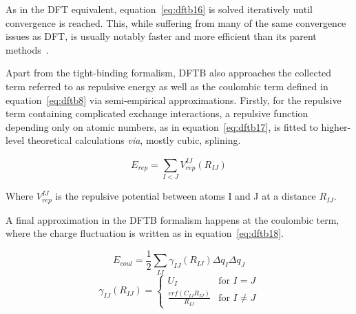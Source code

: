 \documentclass[12pt]{article}
\begin{document}
\bigskip

\noindent As in the DFT equivalent, equation~\ref{eq:dftb16} is solved iteratively until convergence is reached.
This, while suffering from many of the same convergence issues as DFT, is usually notably faster and more efficient than its parent methods~\cite{Elstner2014-zp}.
\\ \par \noindent Apart from the tight-binding formalism, DFTB also approaches the collected term referred to as repulsive energy as well as the coulombic term defined in equation~\ref{eq:dftb8} via semi-empirical approximations.
Firstly, for the repulsive term containing complicated exchange interactions, a repulsive function depending only on atomic numbers, as in equation~\ref{eq:dftb17}, is fitted to higher-level theoretical calculations \textit{via}, mostly cubic, splining.

\begin{equation}
  E_{rep} = \sum_{I<J}^{}V_{rep}^{IJ}(R_{IJ})
  \label{eq:dftb17}
\end{equation}

\bigskip

\noindent Where $V_{rep}^{IJ}$ is the repulsive potential between atoms I and J at a distance $R_{IJ}$.
\\ \par \noindent A final approximation in the DFTB formalism happens at the coulombic term, where the charge fluctuation is written as in equation~\ref{eq:dftb18}.

\begin{equation}
  E_{coul} = \frac{1}{2}\sum_{IJ}^{}\gamma_{IJ}(R_{IJ})\Delta q_I \Delta q_J
  \label{eq:dftb18}
\end{equation}
\begin{equation*}
  \gamma_{IJ}(R_{IJ}) = \begin{cases}
    U_I & \text{for } I = J \\
    \frac{erf(C_{IJ}R_{IJ})}{R_{IJ}} & \text{for } I \neq J
  \end{cases}
\end{equation*}

\bigskip
\end{document}
